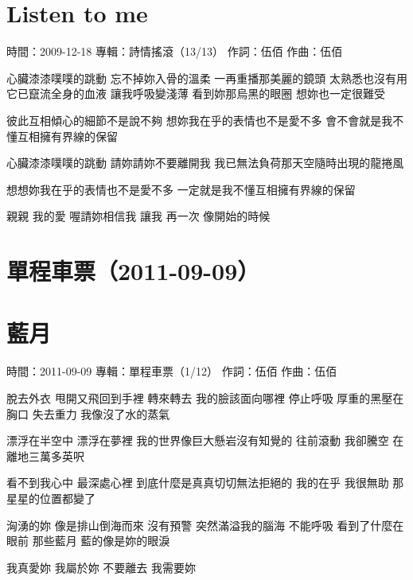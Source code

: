 \documentclass[UTF8,a4paper,oneside,twocolumn,12pt]{ctexbook}
\newcommand{\infopair}[2]{\textbullet #1：#2}
\newcommand{\zc}[1][伍佰]{\infopair{作詞}{#1}}
\newcommand{\zq}[1][伍佰]{\infopair{作曲}{#1}}
\newcommand{\zj}[1]{\infopair{專輯}{#1}}
\newcommand{\sj}[1]{\infopair{時間}{#1}}
\newenvironment{info}{\begin{flushleft}\kaishu
	}
	{\end{flushleft}\normalsize\yahei\par}
\newenvironment{lyric}{
	}
{}
\begin{document}
\section{Listen to me}
\begin{info}
	\sj{2009-12-18}
	\zj{詩情搖滾（13/13）}
	\zc
	\zq
\end{info}
\begin{lyric}
	心臟漆漆噗噗的跳動 忘不掉妳入骨的溫柔
	一再重播那美麗的鏡頭 太熟悉也沒有用
	它已竄流全身的血液 讓我呼吸變淺薄
	看到妳那烏黑的眼圈 想妳也一定很難受

	彼此互相傾心的細節不是說不夠
	想妳我在乎的表情也不是愛不多
	會不會就是我不懂互相擁有界線的保留

	心臟漆漆噗噗的跳動 請妳請妳不要離開我
	我已無法負荷那天空隨時出現的龍捲風

	想想妳我在乎的表情也不是愛不多
	一定就是我不懂互相擁有界線的保留

	親親 我的愛 喔請妳相信我
	讓我 再一次 像開始的時候
\end{lyric}

\section*{單程車票（2011-09-09）}
\section{藍月}
\begin{info}
	\sj{2011-09-09}
	\zj{單程車票（1/12）}
	\zc
	\zq
\end{info}
\begin{lyric}
	脫去外衣 甩開又飛回到手裡
	轉來轉去 我的臉該面向哪裡
	停止呼吸 厚重的黑壓在胸口
	失去重力 我像沒了水的蒸氣

	漂浮在半空中 漂浮在夢裡
	我的世界像巨大懸岩沒有知覺的
	往前滾動 我卻騰空
	在離地三萬多英呎

	看不到我心中 最深處心裡
	到底什麼是真真切切無法拒絕的
	我的在乎 我很無助
	那星星的位置都變了

	洶湧的妳 像是排山倒海而來
	沒有預警 突然滿溢我的腦海
	不能呼吸 看到了什麼在眼前
	那些藍月 藍的像是妳的眼淚

	我真愛妳 我屬於妳
	不要離去 我需要妳
\end{lyric}
\end{document}
